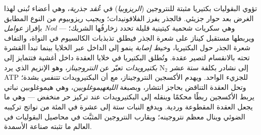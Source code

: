\begin{definition}\label{def:b3:microbiomes:nodule}
تؤوي البقوليات بكتيريا مثبتة للنتروجين (\emph{الريزوبيا})
في \emph{عُقد جذرية}، وهي أعضاء تُبنى لهذا الغرض بعد حوار
جزيئي. فالجذر يفرز الفلافونيدات؛ ويجيب ريزوبيوم من النوع
المطابق بإفراز \emph{عوامل Nod} --- وهي سكريات شحمية
كيتينية قليلة تحدد زخارفُها الشريك؛ ويربطها مستقبل كيناز
على شعرة الجذر فيطلق تذبذبات الكالسيوم في النواة، والتفاف
شعرة الجذر حول البكتيريا، و\emph{خيط إصابة} ينمو إلى
الداخل عبر الخلايا بينما تبدأ القشرة تحته بالانقسام لتصير
عقدة. وتُطلق البكتيريا في خلايا العقدة داخل أغشية فتتمايز
إلى \emph{بكتيرويدات} تعبّر عن \emph{النتروجيناز}، وهو
الإنزيم الذي يرد N$_{2}$ إلى نشادر بكلفة ستة عشر ATP
للجزيء الواحد. ويهدم الأكسجين النتروجيناز، مع أن
البكتيرويدات تتنفس بشدة؛ وتحل العقدة التناقض بحاجز انتشار،
وبصبغة \emph{الليغهيموغلوبين}، وهي هيموغلوبين نباتي يربط
الأكسجين ربطًا محكمًا وينقله إلى البكتيرويدات عند تركيز حر
منخفض --- وهي ما يجعل العقدة المقطوعة وردية. ويدفع النبات
ستة إلى عشرة في المئة من نواتج تركيبه الضوئي وينال معظم
نتروجينه؛ ويقارب النتروجين المثبَّت في محاصيل البقوليات في
العالم ما تثبته صناعة الأسمدة.
\end{definition}

